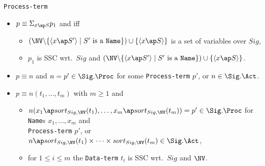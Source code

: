 \documentclass[twoside,fleqn,a4paper,dvips]{article}
\begin{document}
\begin{Dn-arg}{{\tt Process-term}}
\begin{itemize}
\begin{itemize}
$n_i\ap S_1\times \cdots\times S_k\in
\Sig.\Act$ for some $k\geq 1$ and {\tt Name}s $S_1,\ldots,S_k$,
\item
for each $1\leq i<j\leq m$ it holds that $n_i\not\equiv n_j$,
\item
for $1\leq i\leq m$, $k\geq 1$ and {\tt Name}s $S_1,..,S_k$ it holds
that if $n_i\ap S_1\times\cdots\times S_k\in \Sig.\Act$, then also
$n_i'\ap S_1\times\cdots\times S_k\in \Sig.\Act$,
\item
for $1\leq i\leq m$ it holds that if $n_i\in \Sig.\Act$, then also
$n_i'\in \Sig.\Act$,
\item
$p_1$ is SSC wrt.\ $Sig$ and $\NV$.
\end{itemize}
\item
$p\equiv \Sigma_{x\ap S}p_1$ and
iff
\begin{itemize}
\item
$(\NV\backslash\{\langle x\ap S'\rangle \mid S'
\mbox{ is a {\tt Name}}\})\cup\{\langle x\ap S\rangle\}$
is a set of variables over $Sig$,
\item
$p_1$ is SSC wrt.\ $Sig$ and
$(\NV\backslash\{\langle x\ap S'\rangle \mid S'\mbox{ is a
{\tt Name}}\})\cup\{\langle x\ap S\rangle\}$.
\end{itemize}
\item
$p\equiv n$ and 
$n=p'\in \Sig.\Proc$ for some {\tt Process-term} $p'$, or $n\in
\Sig.\Act$.
\item
$p\equiv n(t_1,\ldots,t_m)$
with $m\geq 1$ and
\begin{itemize}
\item
$n(x_1\ap sort_{Sig,\NV}(t_1),\ldots,x_m\ap sort_{Sig,\NV}(t_m))=p'\in
\Sig.\Proc$ for {\tt Name}s $x_1,\ldots,x_m$ and\\ {\tt Process-term} $p'$,
or
$n\ap sort_{Sig,\NV}(t_1)\times \cdots\times sort_{Sig,\NV}(t_m)\in
\Sig.\Act$,
\item
for $1\leq i\leq m$ the {\tt Data-term}
$t_i$ is SSC wrt.\ $Sig$ and $\NV$.
\end{itemize}
\end{itemize}
\end{Dn-arg}
\end{document}
